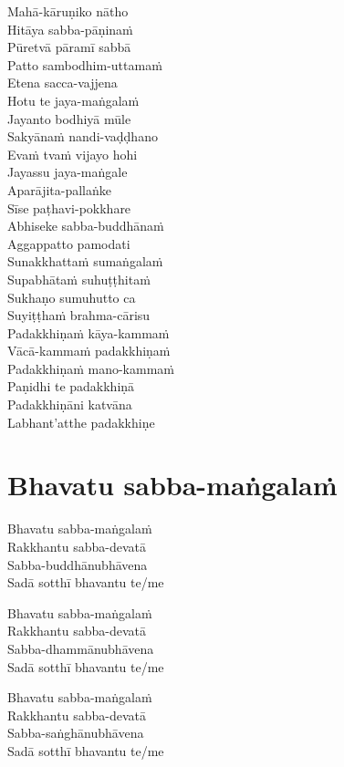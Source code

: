 \begin{paritta}

Mahā-kāruṇiko nātho\\
Hitāya sabba-pāṇinaṁ\\
Pūretvā pāramī sabbā\\
Patto sambodhim-uttamaṁ\\
Etena sacca-vajjena\\
Hotu te jaya-maṅgalaṁ\\
Jayanto bodhiyā mūle\\
Sakyānaṁ nandi-vaḍḍhano\\
Evaṁ tvaṁ vijayo hohi\\
Jayassu jaya-maṅgale\\
Aparājita-pallaṅke\\
Sīse paṭhavi-pokkhare\\
Abhiseke sabba-buddhānaṁ\\
Aggappatto pamodati\\
Sunakkhattaṁ sumaṅgalaṁ\\
Supabhātaṁ suhuṭṭhitaṁ\\
Sukhaṇo sumuhutto ca\\
Suyiṭṭhaṁ brahma-cārisu\\
Padakkhiṇaṁ kāya-kammaṁ\\
Vācā-kammaṁ padakkhiṇaṁ\\
Padakkhiṇaṁ mano-kammaṁ\\
Paṇidhi te padakkhiṇā\\
Padakkhiṇāni katvāna\\
Labhant'atthe padakkhiṇe


\end{paritta}

\clearpage

\chapter{Bhavatu sabba-maṅgalaṁ}


\begin{paritta}
Bhavatu sabba-maṅgalaṁ\\
Rakkhantu sabba-devatā\\
Sabba-buddhānubhāvena\\
Sadā sotthī bhavantu te/me

Bhavatu sabba-maṅgalaṁ\\
Rakkhantu sabba-devatā\\
Sabba-dhammānubhāvena\\
Sadā sotthī bhavantu te/me

Bhavatu sabba-maṅgalaṁ\\
Rakkhantu sabba-devatā\\
Sabba-saṅghānubhāvena\\
Sadā sotthī bhavantu te/me
\end{paritta}

